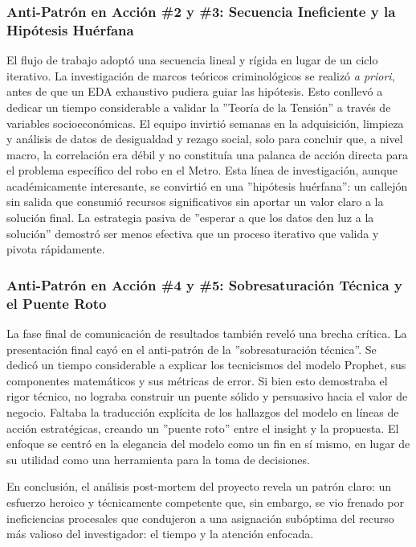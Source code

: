 \documentclass[11pt, a4paper]{article}
\begin{document}
\subsubsection{Anti-Patrón en Acción \#2 y \#3: Secuencia Ineficiente y la Hipótesis Huérfana}
El flujo de trabajo adoptó una secuencia lineal y rígida en lugar de un ciclo iterativo. La investigación de marcos teóricos criminológicos se realizó \textit{a priori}, antes de que un EDA exhaustivo pudiera guiar las hipótesis. Esto conllevó a dedicar un tiempo considerable a validar la ''Teoría de la Tensión'' a través de variables socioeconómicas. El equipo invirtió semanas en la adquisición, limpieza y análisis de datos de desigualdad y rezago social, solo para concluir que, a nivel macro, la correlación era débil y no constituía una palanca de acción directa para el problema específico del robo en el Metro. Esta línea de investigación, aunque académicamente interesante, se convirtió en una ''hipótesis huérfana'': un callejón sin salida que consumió recursos significativos sin aportar un valor claro a la solución final. La estrategia pasiva de ''esperar a que los datos den luz a la solución'' demostró ser menos efectiva que un proceso iterativo que valida y pivota rápidamente.

\subsubsection{Anti-Patrón en Acción \#4 y \#5: Sobresaturación Técnica y el Puente Roto}
La fase final de comunicación de resultados también reveló una brecha crítica. La presentación final cayó en el anti-patrón de la ''sobresaturación técnica''. Se dedicó un tiempo considerable a explicar los tecnicismos del modelo Prophet, sus componentes matemáticos y sus métricas de error. Si bien esto demostraba el rigor técnico, no lograba construir un puente sólido y persuasivo hacia el valor de negocio. Faltaba la traducción explícita de los hallazgos del modelo en líneas de acción estratégicas, creando un ''puente roto'' entre el insight y la propuesta. El enfoque se centró en la elegancia del modelo como un fin en sí mismo, en lugar de su utilidad como una herramienta para la toma de decisiones.

En conclusión, el análisis post-mortem del proyecto revela un patrón claro: un esfuerzo heroico y técnicamente competente que, sin embargo, se vio frenado por ineficiencias procesales que condujeron a una asignación subóptima del recurso más valioso del investigador: el tiempo y la atención enfocada.
\end{document}
